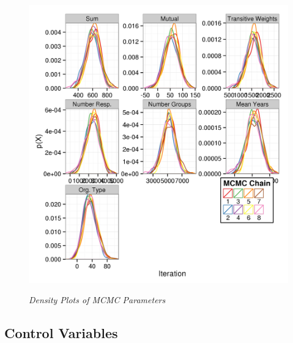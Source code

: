 \documentclass[12pt,a4paper,titlepage]{article}
\begin{document}
\begin{figure}[!ht]
\caption{\textit{Density Plots of MCMC Parameters}}
\graphicspath{ {`/Users/TScott/Google\space Drive/elwha/PSJ_Submission/Version3'}}
\noindent
\includegraphics[width=6.5in]
{densityplotdu}
\label{figure:densityplots}
\end{figure}

\subsection{Control Variables}
\end{document}
